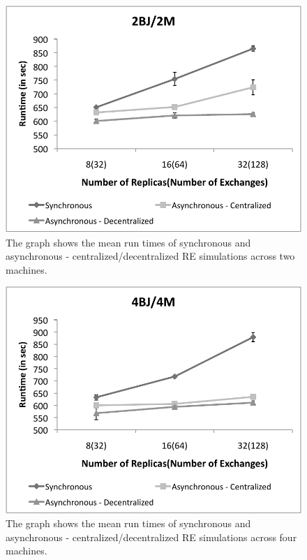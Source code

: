 \documentclass[a4paper,10pt]{article}
\begin{document}
%
\begin{figure}
\centering
\includegraphics[scale=0.80]{data/2Machines.pdf}
\caption{\small The graph shows the mean run times of synchronous and asynchronous - centralized/decentralized RE simulations across two machines.}
\label{fig:2machines}
\vspace{-1em}
\end{figure}

\begin{figure}
\centering
\includegraphics[scale=0.80]{data/4Machines.pdf}
\caption{\small The graph shows the mean run times of synchronous and asynchronous - centralized/decentralized RE simulations across four machines.}
\label{fig:4machines}
\vspace{-1em}
\end{figure}
\end{document}
